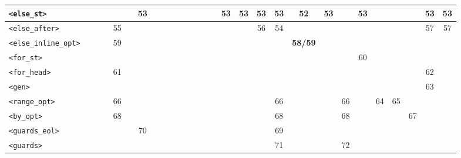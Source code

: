 \begin{center}
\begin{tabular}{|l|c|c|c|c|c|c|c|c|c|c|c|c|c|c|c|c|c|c|c|c|c|c|c|c|c|c|c|}
\texttt{<else\_st>} &  &  &  &  &  & 53 &  &  &  &  &  &  &  &  & 53 & 53 & 53 & 53 & 52 & 53 &  & 53 &  &  &  & 53 & 53 \\ \hline
\texttt{<else\_after>} &  &  &  & 55 &  &  &  &  &  &  &  &  &  &  &  &  & 56 & 54 &  &  &  &  &  &  &  & 57 & 57 \\ \hline
\texttt{<else\_inline\_opt>} &  &  &  & 59 &  &  &  &  &  &  &  &  &  &  &  &  &  &  & \textbf{58/59} &  &  &  &  &  &  &  &  \\ \hline
\texttt{<for\_st>} &  &  &  &  &  &  &  &  &  &  &  &  &  &  &  &  &  &  &  &  &  & 60 &  &  &  &  &  \\ \hline
\texttt{<for\_head>} &  &  &  & 61 &  &  &  &  &  &  &  &  &  &  &  &  &  &  &  &  &  &  &  &  &  & 62 &  \\ \hline
\texttt{<gen>} &  &  &  &  &  &  &  &  &  &  &  &  &  &  &  &  &  &  &  &  &  &  &  &  &  & 63 &  \\ \hline
\texttt{<range\_opt>} &  &  &  & 66 &  &  &  &  &  &  &  &  &  &  &  &  &  & 66 &  &  & 66 &  & 64 & 65 &  &  &  \\ \hline
\texttt{<by\_opt>} &  &  &  & 68 &  &  &  &  &  &  &  &  &  &  &  &  &  & 68 &  &  & 68 &  &  &  & 67 &  &  \\ \hline
\texttt{<guards\_eol>} &  &  &  &  &  & 70 &  &  &  &  &  &  &  &  &  &  &  & 69 &  &  &  &  &  &  &  &  &  \\ \hline
\texttt{<guards>} &  &  &  &  &  &  &  &  &  &  &  &  &  &  &  &  &  & 71 &  &  & 72 &  &  &  &  &  &  \\ \hline
\end{tabular}
\end{center}

